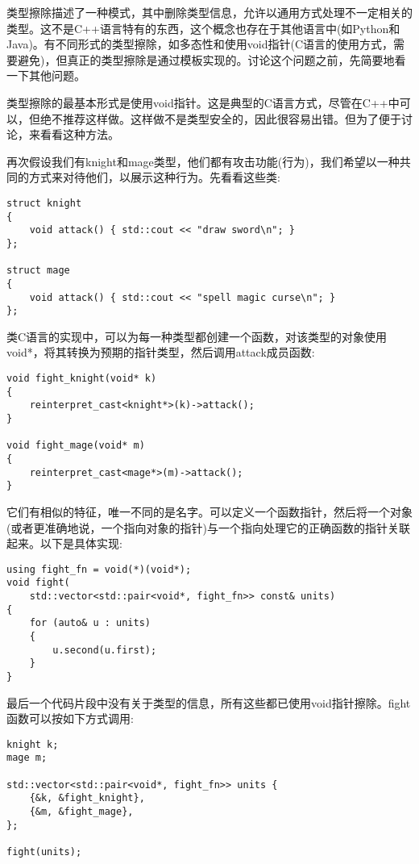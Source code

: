 类型擦除描述了一种模式，其中删除类型信息，允许以通用方式处理不一定相关的类型。这不是C++语言特有的东西，这个概念也存在于其他语言中(如Python和Java)。有不同形式的类型擦除，如多态性和使用void指针(C语言的使用方式，需要避免)，但真正的类型擦除是通过模板实现的。讨论这个问题之前，先简要地看一下其他问题。

类型擦除的最基本形式是使用void指针。这是典型的C语言方式，尽管在C++中可以，但绝不推荐这样做。这样做不是类型安全的，因此很容易出错。但为了便于讨论，来看看这种方法。

再次假设我们有knight和mage类型，他们都有攻击功能(行为)，我们希望以一种共同的方式来对待他们，以展示这种行为。先看看这些类:

\begin{lstlisting}[style=styleCXX]
struct knight
{
	void attack() { std::cout << "draw sword\n"; }
};

struct mage
{
	void attack() { std::cout << "spell magic curse\n"; }
};
\end{lstlisting}

类C语言的实现中，可以为每一种类型都创建一个函数，对该类型的对象使用void*，将其转换为预期的指针类型，然后调用attack成员函数:

\begin{lstlisting}[style=styleCXX]
void fight_knight(void* k)
{
	reinterpret_cast<knight*>(k)->attack();
}

void fight_mage(void* m)
{
	reinterpret_cast<mage*>(m)->attack();
}
\end{lstlisting}

它们有相似的特征，唯一不同的是名字。可以定义一个函数指针，然后将一个对象(或者更准确地说，一个指向对象的指针)与一个指向处理它的正确函数的指针关联起来。以下是具体实现:

\begin{lstlisting}[style=styleCXX]
using fight_fn = void(*)(void*);
void fight(
	std::vector<std::pair<void*, fight_fn>> const& units)
{
	for (auto& u : units)
	{
		u.second(u.first);
	}
}
\end{lstlisting}

最后一个代码片段中没有关于类型的信息，所有这些都已使用void指针擦除。fight函数可以按如下方式调用:

\begin{lstlisting}[style=styleCXX]
knight k;
mage m;

std::vector<std::pair<void*, fight_fn>> units {
	{&k, &fight_knight},
	{&m, &fight_mage},
};

fight(units);
\end{lstlisting}

